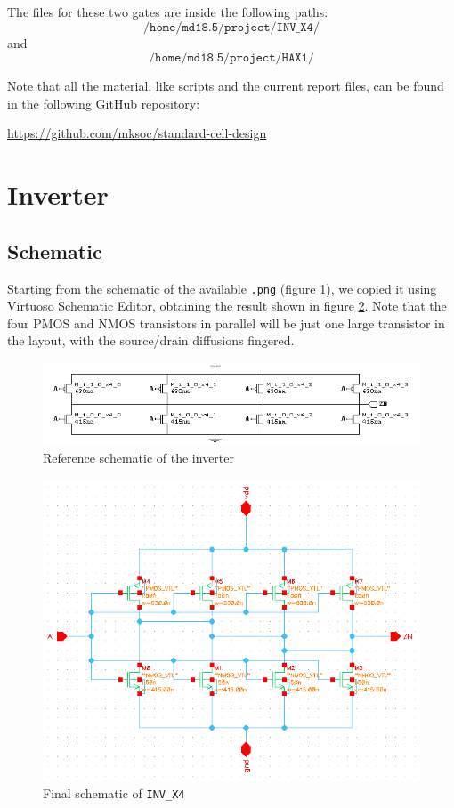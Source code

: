 \documentclass[a4paper]{article}
\newcommand{\inv}{\texttt{INV\_X4}\xspace}
\begin{document}
The files for these two gates are inside the following paths:
\begin{equation*}
	\texttt{/home/md18.5/project/INV\_X4/}
\end{equation*}
and
\begin{equation*}
	\texttt{/home/md18.5/project/HAX1/}
\end{equation*}

Note that all the material, like scripts and the current report files, can be found in the following GitHub repository:
\begin{center}
	\url{https://github.com/mksoc/standard-cell-design}
\end{center}

\section{Inverter}
\subsection{Schematic}
\label{sec: inv_sch}
Starting from the schematic of the available \texttt{.png} (figure \ref{fig:inv_png}), we copied it using Virtuoso Schematic Editor, obtaining the result shown in figure \ref{fig:inv_schematic}. Note that the four PMOS and NMOS transistors in parallel will be just one large transistor in the layout, with the source/drain diffusions fingered.
\begin{figure}[H]
	\centering
	\includegraphics[width=1\linewidth]{../INV_X4/INV_X4.png}
	\caption{Reference schematic of the inverter}
	\label{fig:inv_png}
\end{figure}
\begin{figure}[H]
	\centering
	\includegraphics[width=\linewidth]{../INV_X4/INV_X4_schematic.png}
	\caption{Final schematic of \inv}
	\label{fig:inv_schematic}
\end{figure}
\end{document}
